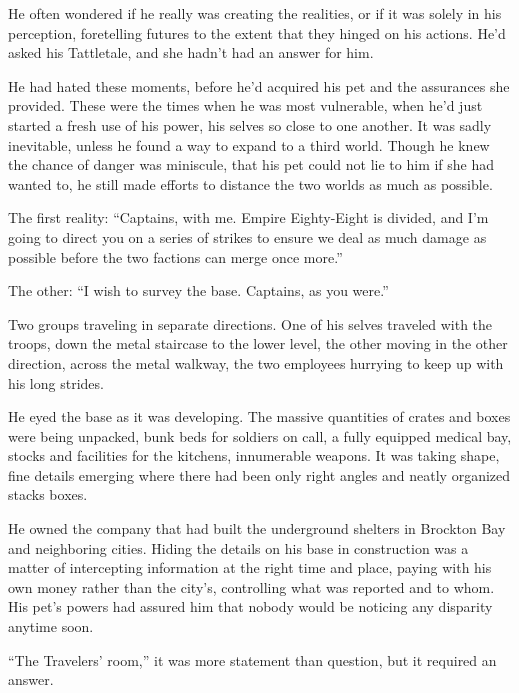 He often wondered if he really was creating the realities, or if it was solely in his perception, foretelling futures to the extent that they hinged on his actions.  He'd asked his Tattletale, and she hadn't had an answer for him.



He had hated these moments, before he'd acquired his pet and the assurances she provided.  These were the times when he was most vulnerable,  when he'd just started a fresh use of his power, his selves so close to one another.  It was sadly inevitable, unless he found a way to expand to a third world.  Though he knew the chance of danger was miniscule, that his pet could not lie to him if she had wanted to, he still made efforts to distance the two worlds as much as possible.



The first reality: ``Captains, with me.  Empire Eighty-Eight is divided, and I'm going to direct you on a series of strikes to ensure we deal as much damage as possible before the two factions can merge once more.''



The other: ``I wish to survey the base.  Captains, as you were.''



Two groups traveling in separate directions.  One of his selves traveled with the troops, down the metal staircase to the lower level, the other moving in the other direction, across the metal walkway, the two employees hurrying to keep up with his long strides.



He eyed the base as it was developing.  The massive quantities of crates and boxes were being unpacked, bunk beds for soldiers on call, a fully equipped medical bay, stocks and facilities for the kitchens, innumerable weapons.  It was taking shape, fine details emerging where there had been only right angles and neatly organized stacks boxes.



He owned the company that had built the underground shelters in Brockton Bay and neighboring cities.  Hiding the details on his base in construction was a matter of intercepting information at the right time and place, paying with his own money rather than the city's, controlling what was reported and to whom.  His pet's powers had assured him that nobody would be noticing any disparity anytime soon.



``The Travelers' room,'' it was more statement than question, but it required an answer.



